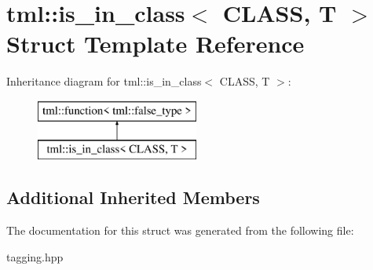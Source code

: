 \hypertarget{structtml_1_1is__in__class}{\section{tml\+:\+:is\+\_\+in\+\_\+class$<$ C\+L\+A\+S\+S, T $>$ Struct Template Reference}
\label{structtml_1_1is__in__class}
}
Inheritance diagram for tml\+:\+:is\+\_\+in\+\_\+class$<$ C\+L\+A\+S\+S, T $>$\+:\begin{figure}[H]
\begin{center}
\leavevmode
\includegraphics[height=2.000000cm]{structtml_1_1is__in__class}
\end{center}
\end{figure}
\subsection*{Additional Inherited Members}


The documentation for this struct was generated from the following file\+:\begin{DoxyCompactItemize}
\item 
tagging.\+hpp\end{DoxyCompactItemize}
